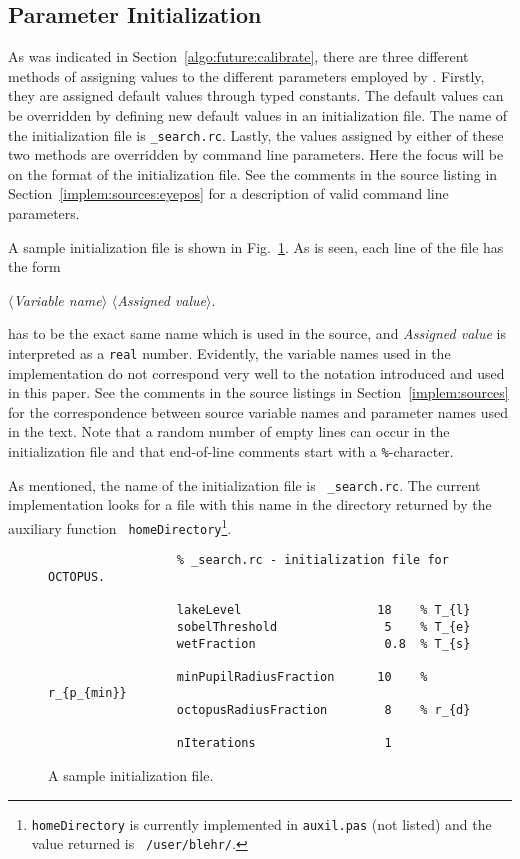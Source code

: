 \subsection{Parameter Initialization}
\label{implem:details:param}

As was indicated in Section~\ref{algo:future:calibrate}, there are
three different methods of assigning values to the different
parameters employed by {\octopus}.  Firstly, they are assigned default
values through typed constants.  The default values can be overridden
by defining new default values in an initialization file.  The name of
the initialization file is {\tt \_search.rc}.  Lastly, the values
assigned by either of these two methods are overridden by command line
parameters.  Here the focus will be on the format of the
initialization file.  See the comments in the source listing in
Section~\ref{implem:sources:eyepos} for a description of valid command
line parameters.

A sample initialization file is shown in Fig.~\ref{fig:initfile}.  As
is seen, each line of the file has the form

\begin{center}
  $\langle${\sl Variable name\/}$\rangle$ $\langle${\sl Assigned
    value\/}$\rangle$.
\end{center}

 has to be the exact same name which is
used in the source, and {\sl Assigned value\/} is interpreted as a
{\tt real} number.  Evidently, the variable names used in the
implementation do not correspond very well to the notation introduced
and used in this paper.  See the comments in the source listings in
Section~\ref{implem:sources} for the correspondence between source
variable names and parameter names used in the text.  Note that a
random number of empty lines can occur in the initialization file and
that end-of-line comments start with a {\tt \%}-character.

As mentioned, the name of the initialization file is {\tt
  \_search.rc}.  The current implementation looks for a file with this
name in the directory returned by the auxiliary function {\tt
  homeDirectory}\footnote{{\tt homeDirectory} is currently implemented
  in {\tt auxil.pas} (not listed) and the value returned is {\tt
    /user/blehr/}.}.

\begin{figure}[tb]
  \begin{verbatim}
                  % _search.rc - initialization file for OCTOPUS.

                  lakeLevel                   18    % T_{l}
                  sobelThreshold               5    % T_{e}
                  wetFraction                  0.8  % T_{s}

                  minPupilRadiusFraction      10    % r_{p_{min}}
                  octopusRadiusFraction        8    % r_{d}

                  nIterations                  1
    \end{verbatim}
  \caption{\label{fig:initfile}A sample initialization file.}
\end{figure}

